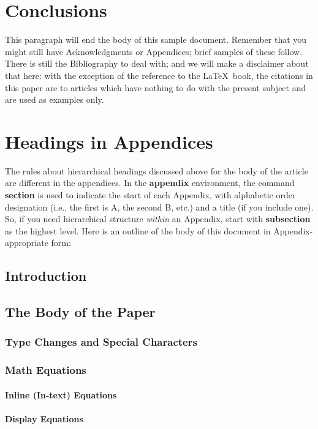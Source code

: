 \section{Conclusions}
This paragraph will end the body of this sample document.
Remember that you might still have Acknowledgments or
Appendices; brief samples of these
follow.  There is still the Bibliography to deal with; and
we will make a disclaimer about that here: with the exception
of the reference to the \LaTeX\ book, the citations in
this paper are to articles which have nothing to
do with the present subject and are used as
examples only.



\appendix
\section{Headings in Appendices}
The rules about hierarchical headings discussed above for
the body of the article are different in the appendices.
In the \textbf{appendix} environment, the command
\textbf{section} is used to
indicate the start of each Appendix, with alphabetic order
designation (i.e., the first is A, the second B, etc.) and
a title (if you include one).  So, if you need
hierarchical structure
\textit{within} an Appendix, start with \textbf{subsection} as the
highest level. Here is an outline of the body of this
document in Appendix-appropriate form:
\subsection{Introduction}
\subsection{The Body of the Paper}
\subsubsection{Type Changes and  Special Characters}
\subsubsection{Math Equations}
\paragraph{Inline (In-text) Equations}
\paragraph{Display Equations}
